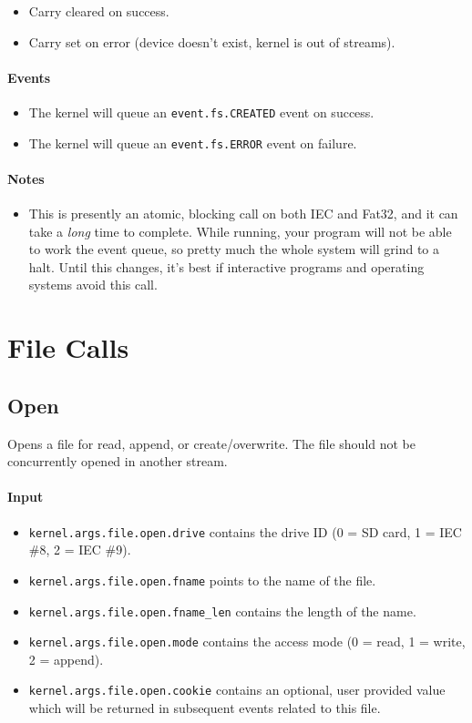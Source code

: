 \begin{itemize}
\item Carry cleared on success.
\item Carry set on error (device doesn't exist, kernel is out of streams).
\end{itemize}

\paragraph{Events}

\begin{itemize}
\item The kernel will queue an \verb+event.fs.CREATED+ event on success.
\item The kernel will queue an \verb+event.fs.ERROR+ event on failure.
\end{itemize}

\paragraph{Notes}

\begin{itemize}
\item This is presently an atomic, blocking call on both IEC and Fat32, and it can take a {\em long} time to complete.  While running, your program will not be able to work the event queue, so pretty much the whole system will grind to a halt.  Until this changes, it's best if interactive programs and operating systems avoid this call.  
\end{itemize}

\section*{File Calls}

\subsection*{Open}
Opens a file for read, append, or create/overwrite.  The file should not be concurrently opened in another stream.

\paragraph{Input}

\begin{itemize}
\item \verb+kernel.args.file.open.drive+ contains the drive ID (0 = SD card, 1 = IEC \#8, 2 = IEC \#9).
\item \verb+kernel.args.file.open.fname+ points to the name of the file.
\item \verb+kernel.args.file.open.fname_len+ contains the length of the name.
\item \verb+kernel.args.file.open.mode+ contains the access mode (0 = read, 1 = write, 2 = append). 
\item \verb+kernel.args.file.open.cookie+ contains an optional, user provided value which will be returned in subsequent events related to this file.
\end{itemize}

